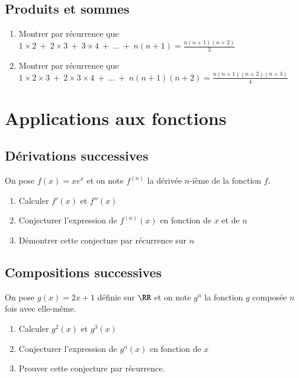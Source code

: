 \documentclass[oneside,12pt]{article}          %
\begin{document}
\subsection{Produits et sommes}
\begin{enumerate}
    \item Montrer par récurrence que $1\times2~+~2\times3~+~3\times4~+~\ldots~+~n(n+1)=\frac{n(n+1)(n+2)}{3}$
    \item Montrer par récurrence que $1\times2\times3~+~2\times3\times4~+~\ldots~+~n(n+1)(n+2)=\frac{n(n+1)(n+2)(n+3)}{4}$
\end{enumerate}



\section{Applications aux fonctions}

\subsection{Dérivations successives}
On pose $f(x)=xe^x$ et on note $f^{(n)}$ la dérivée $n$-ième de la fonction $f$.
\begin{enumerate}
	\item Calculer $f'(x)$ et $f''(x)$
	\item Conjecturer l'expression de $f^{(n)}(x)$ en fonction de $x$ et de $n$
	\item Démontrer cette conjecture par récurrence sur $n$
\end{enumerate}



\subsection{Compositions successives}
On pose $g(x)=2x+1$ définie sur $\RR$ et on note $g^n$ la fonction $g$ composée $n$ fois avec elle-même.
\begin{enumerate}
	\item Calculer $g^2(x)$ et $g^3(x)$
	\item Conjecturer l'expression de $g^n(x)$ en fonction de $x$
	\item Prouver cette conjecture par récurrence.
\end{enumerate}
\end{document}

